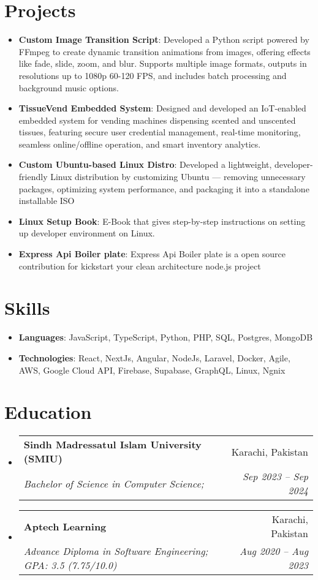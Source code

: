 \documentclass[letterpaper,11pt]{article}
\makeatletter
\newcommand{\resumeItem}[2]{
  \item\small{
    \textbf{#1}{: #2 \vspace{-2pt}}
  }
}
\newcommand{\resumeSubheading}[4]{
  \vspace{-1pt}\item
    \begin{tabular*}{0.97\textwidth}[t]{l@{\extracolsep{\fill}}r}
      \textbf{#1} & #2 \\
      \textit{\small#3} & \textit{\small #4} \\
    \end{tabular*}\vspace{-5pt}
}
\newcommand{\resumeSubItem}[2]{\resumeItem{#1}{#2}\vspace{-4pt}}
\newcommand{\resumeSubHeadingListStart}{\begin{itemize}[leftmargin=*]}
\newcommand{\resumeSubHeadingListEnd}{\end{itemize}}
\makeatother
\begin{document}
\section{Projects}
  \resumeSubHeadingListStart
    \resumeSubItem{Custom Image Transition Script}
      {Developed a Python script powered by FFmpeg to create dynamic transition animations from images, offering effects like fade, slide, zoom, and blur. Supports multiple image formats, outputs in resolutions up to 1080p 60-120 FPS, and includes batch processing and background music options.}
    \resumeSubItem{TissueVend Embedded System}
      {Designed and developed an IoT-enabled embedded system for vending machines dispensing scented and unscented tissues, featuring secure user credential management, real-time monitoring, seamless online/offline operation, and smart inventory analytics.}
    \resumeSubItem{Custom Ubuntu-based Linux Distro}
      {Developed a lightweight, developer-friendly Linux distribution by customizing Ubuntu — removing unnecessary packages, optimizing system performance, and packaging it into a standalone installable ISO}
    \resumeSubItem{Linux Setup Book}
      {E-Book that gives step-by-step instructions on setting up developer environment on Linux.}
    \resumeSubItem{Express Api Boiler plate}
      {Express Api Boiler plate is a open source contribution for kickstart your clean architecture node.js project}
  \resumeSubHeadingListEnd

%
\section{Skills}
 \resumeSubHeadingListStart
   \item{\textbf{Languages}{: JavaScript, TypeScript, Python, PHP, SQL, Postgres, MongoDB}}
   \item{\textbf{Technologies}{: React, NextJs, Angular, NodeJs, Laravel, Docker, Agile, AWS, Google Cloud API, Firebase, Supabase, GraphQL, Linux, Ngnix}}
 \resumeSubHeadingListEnd



\section{Education}
\resumeSubHeadingListStart
  \resumeSubheading
    {Sindh Madressatul Islam University (SMIU)}{Karachi, Pakistan}
    {Bachelor of Science in Computer Science;}{Sep 2023 -- Sep 2024}
  \resumeSubheading
    {Aptech Learning}{Karachi, Pakistan}
    {Advance Diploma in Software Engineering; GPA: 3.5 (7.75/10.0)}{Aug 2020 -- Aug 2023}
\resumeSubHeadingListEnd


\end{document}
